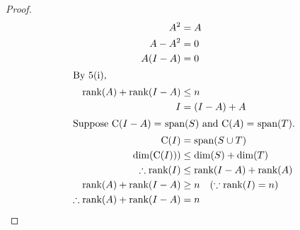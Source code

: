 \documentclass[12pt]{article}
\newenvironment{problem}[2][Problem]{\begin{trivlist}
\item[\hskip \labelsep {\bfseries #1}\hskip \labelsep {\bfseries #2.}]}{\end{trivlist}}
\begin{document}
\begin{problem}{5.ii}
\end{problem}
\begin{proof}
\begin{align*}
A^2 &= A\\
A - A^2 &= 0\\
A(I - A) &= 0\\
\shortintertext{By 5(i),}
\text{rank}(A) + \text{rank}(I - A) &\le n\\
I &= (I - A) + A\\
\intertext{Suppose C$(I - A) =$ span$(S)$ and C$(A) =$ span$(T)$.}
\text{C}(I) &= \text{span}(S \cup T)\\
\text{dim(C$(I)$))} &\le \text{dim}(S) + \text{dim}(T)\\
\therefore \text{rank}(I) &\le \text{rank}(I - A) + \text{rank}(A)\\
\text{rank}(A) + \text{rank}(I - A) &\ge n \quad (\because \text{rank}(I) = n)\\
\therefore \text{rank}(A) + \text{rank}(I - A) &= n\\
\end{align*}
\end{proof}
\filbreak
\end{document}
